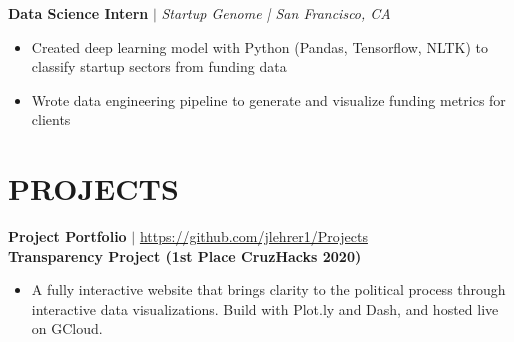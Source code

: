 \documentclass[margin]{res}
\begin{document}
\begin{resume}
   \textbf{Data Science Intern} $\mid$ \textit{Startup Genome | San Francisco, CA} 
    \begin{itemize}
        \item Created deep learning model with Python (Pandas, Tensorflow, NLTK) to classify startup sectors from funding data 
        \item Wrote data engineering pipeline to generate and visualize funding metrics for clients
    \end{itemize} \vspace*{-10pt}
\section{PROJECTS}
    \textbf{Project Portfolio} $\mid$ \textcolor{blue}{\href{https://github.com/jlehrer1/Projects}{https://github.com/jlehrer1/Projects}} \vspace {2mm} \\
    \textbf{Transparency Project (1st Place CruzHacks 2020)}
    \begin{itemize}
        \item A fully interactive website that brings clarity to the political process through interactive data visualizations. Build with Plot.ly and Dash, and hosted live on GCloud.
    \end{itemize}\vspace*{-8pt}


\end{resume}
\end{document}
